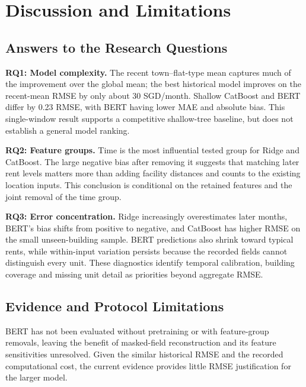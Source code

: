 \section{Discussion and Limitations}\label{sec:discussion}
\subsection{Answers to the Research Questions}
\textbf{RQ1: Model complexity.} The recent town--flat-type mean captures much of the improvement over the global mean; the best historical model improves on the recent-mean RMSE by only about 30 SGD/month.  Shallow CatBoost and BERT differ by 0.23 RMSE, with BERT having lower MAE and absolute bias.  This single-window result supports a competitive shallow-tree baseline, but does not establish a general model ranking.

\textbf{RQ2: Feature groups.} Time is the most influential tested group for Ridge and CatBoost.  The large negative bias after removing it suggests that matching later rent levels matters more than adding facility distances and counts to the existing location inputs.  This conclusion is conditional on the retained features and the joint removal of the time group.

\textbf{RQ3: Error concentration.} Ridge increasingly overestimates later months, BERT's bias shifts from positive to negative, and CatBoost has higher RMSE on the small unseen-building sample.  BERT predictions also shrink toward typical rents, while within-input variation persists because the recorded fields cannot distinguish every unit.  These diagnostics identify temporal calibration, building coverage and missing unit detail as priorities beyond aggregate RMSE.

\subsection{Evidence and Protocol Limitations}
BERT has not been evaluated without pretraining or with feature-group removals, leaving the benefit of masked-field reconstruction and its feature sensitivities unresolved.  Given the similar historical RMSE and the recorded computational cost, the current evidence provides little RMSE justification for the larger model.

